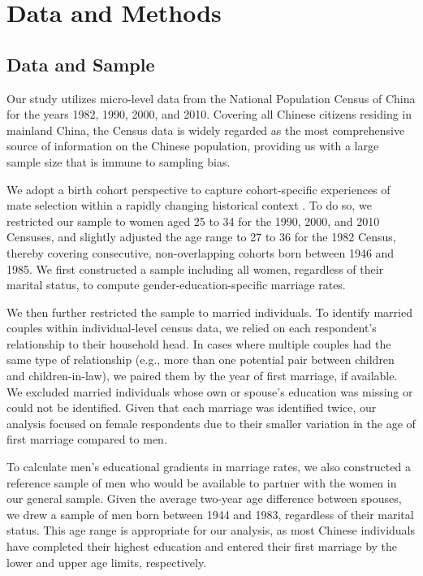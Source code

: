 \section{Data and Methods}
\label{sec:ch4-data-methods}

\subsection{Data and Sample}

Our study utilizes micro-level data from the National Population Census of China for the years 1982, 1990, 2000, and 2010. Covering all Chinese citizens residing in mainland China, the Census data is widely regarded as the most comprehensive source of information on the Chinese population, providing us with a large sample size that is immune to sampling bias.

We adopt a birth cohort perspective to capture cohort-specific experiences of mate selection within a rapidly changing historical context \parencite{dongTrendsEducationalAssortative2023}. To do so, we restricted our sample to women aged 25 to 34 for the 1990, 2000, and 2010 Censuses, and slightly adjusted the age range to 27 to 36 for the 1982 Census, thereby covering consecutive, non-overlapping cohorts born between 1946 and 1985. We first constructed a sample including all women, regardless of their marital status, to compute gender-education-specific marriage rates.

We then further restricted the sample to married individuals. To identify married couples within individual-level census data, we relied on each respondent's relationship to their household head. In cases where multiple couples had the same type of relationship (e.g., more than one potential pair between children and children-in-law), we paired them by the year of first marriage, if available. We excluded married individuals whose own or spouse's education was missing or could not be identified. Given that each marriage was identified twice, our analysis focused on female respondents due to their smaller variation in the age of first marriage compared to men.

To calculate men's educational gradients in marriage rates, we also constructed a reference sample of men who would be available to partner with the women in our general sample. Given the average two-year age difference between spouses, we drew a sample of men born between 1944 and 1983, regardless of their marital status. This age range is appropriate for our analysis, as most Chinese individuals have completed their highest education and entered their first marriage by the lower and upper age limits, respectively.

